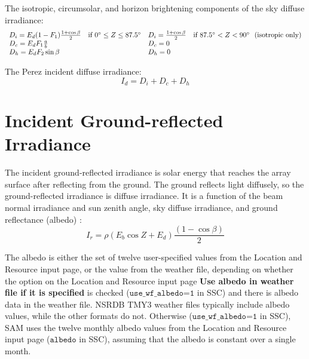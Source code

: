 \documentclass[12pt,letterpaper]{article}
\begin{document}
The isotropic, circumsolar, and horizon brightening components of the sky diffuse irradiance:
\begin{equation}
\begin{array}{ll}
D_i = E_d (1-F_1) \frac{1+\cos\beta}{2} & \text{if $0\degree \leq Z \leq 87.5\degree$} \notag\\
D_c = E_d F_1 \frac{a}{b}&\notag\\
D_h = E_d F_2 \sin\beta &
\end{array}
\begin{array}{ll}
D_i =\frac{1+\cos\beta}{2} & \text{if $87.5\degree < Z < 90\degree$}~~\text{(isotropic only)} \notag\\
D_c = 0 &\\
D_h = 0 &
\end{array}
\end{equation}

The Perez incident diffuse irradiance:
\begin{equation}
I_d = D_i + D_c + D_h
\end{equation}

\section{Incident Ground-reflected Irradiance}\label{sec-groundreflected}

The incident ground-reflected irradiance is solar energy that reaches the array surface after reflecting from the ground. The ground reflects light diffusely, so the ground-reflected irradiance is diffuse irradiance. It is a function of the beam normal irradiance and sun zenith angle, sky diffuse irradiance, and ground reflectance (albedo) \citep{liu1963}:
\begin{equation}
I_{r}= \mathit{\rho} \left( E_b \cos Z + E_d \right) \frac{( 1 - \cos\beta )}{2}
\end{equation}

The albedo is either the set of twelve user-specified values from the Location and Resource input page, or the value from the weather file, depending on whether the option on the Location and Resource input page \textbf{Use albedo in weather file if it is specified} is checked ($\texttt{use\_wf\_albedo=1}$ in SSC) and there is albedo data in the weather file. NSRDB TMY3 weather files typically include albedo values, while the other formats do not. Otherwise ($\texttt{use\_wf\_albedo=1}$ in SSC), SAM uses the twelve monthly albedo values from the Location and Resource input page ($\texttt{albedo}$ in SSC), assuming that the albedo is constant over a single month.
\end{document}
